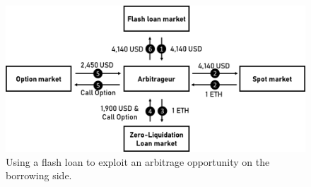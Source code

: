 \documentclass[a4paper]{article}
\begin{document}
\begin{figure}
    \centering
    \includegraphics[width=1.0\textwidth]{figures/zero_liquidation_loan_use_case.png}
    \cprotect\caption{\small Using a flash loan to exploit an arbitrage opportunity on the borrowing side.}
    \label{fig:zero_liquidation_loan_use_case}
\end{figure}
\end{document}
